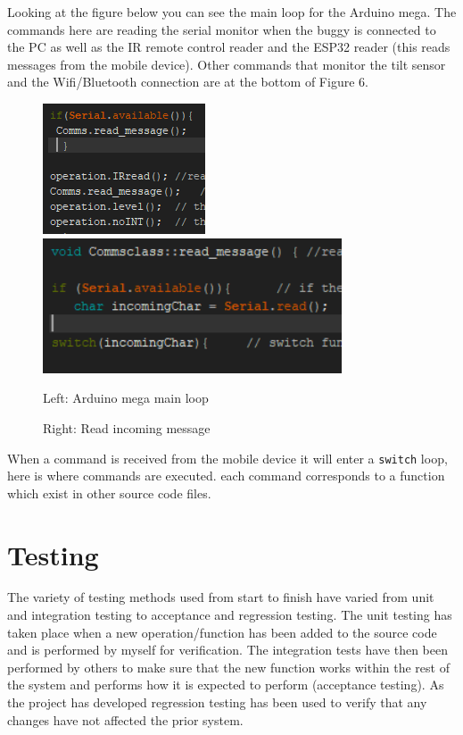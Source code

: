 \documentclass[8pt, a4paper]{article}
\begin{document}
Looking at the figure below you can see the main loop for the Arduino mega. The commands here are reading the serial monitor when the buggy is connected to the PC as well as the IR remote control reader and the ESP32 reader (this reads messages from the mobile device). Other commands that monitor the tilt sensor and the Wifi/Bluetooth connection are at the bottom of Figure 6. 

\begin{figure}[h]
\centering
\includegraphics[]{main_loop}
\includegraphics[height=4cm]{read_message}
\caption{Left: Arduino mega main loop}
\caption{Right: Read incoming message}
\end{figure}

When a command is received from the mobile device it will enter a \verb|switch| loop, here is where commands are executed. each command corresponds to a function which exist in other source code files.


\section{Testing}

The variety of testing methods used from start to finish have varied from unit and integration testing to acceptance and regression testing. The unit testing has taken place when a new operation/function has been added to the source code and is performed by myself for verification. The integration tests have then been performed by others to make sure that the new function works within the rest of the system and performs how it is expected to perform (acceptance testing). As the project has developed regression testing has been used to verify that any changes have not affected the prior system.   
\end{document}
